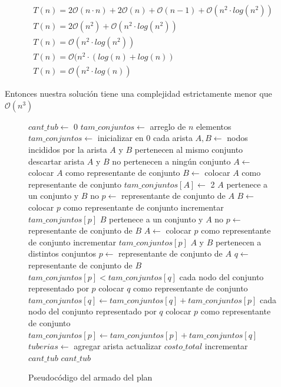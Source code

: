 \begin{equation*}
\begin{array}{l}
T(n) = 2\mathcal{O}(n \cdot n) + 2\mathcal{O}(n) + \mathcal{O}(n-1) + \mathcal{O}(n^2 \cdot log(n^2))\\
T(n) = 2\mathcal{O}(n^2) + \mathcal{O}(n^2 \cdot log(n^2))\\
T(n) = \mathcal{O}(n^2 \cdot log(n^2))\\
T(n) = \mathcal{O}(n^2 \cdot (log(n) + log(n))\\
T(n) = \mathcal{O}(n^2 \cdot log(n))
\end{array}
\end{equation*}

Entonces nuestra solución tiene una complejidad estrictamente menor que $\mathcal{O}(n^3)$

\begin{figure}[!ht]
\begin{codebox}
\li $cant\_tub \leftarrow$ 0
\li $tam\_conjuntos \leftarrow$ arreglo de $n$ elementos
\li $tam\_conjuntos \leftarrow$ inicializar en 0
\li \For cada arista
\li 	\Do 
		$A,B \leftarrow$ nodos incididos por la arista
\li 		\If $A$ y $B$ pertenecen al mismo conjunto
\li 		\Then descartar arista
\li 		\Else
\li			\If $A$ y $B$ no pertenecen a ningún conjunto
\li 			\Then 
				$A \leftarrow$ colocar $A$ como representante de conjunto
\li 				$B \leftarrow$ colocar $A$ como representante de conjunto
\li 				$tam\_conjuntos[A] \leftarrow$ 2
\li			\Else \If $A$ pertenece a un conjunto y $B$ no
\li 				\Then 
					$p \leftarrow$ representante de conjunto de $A$
\li 					$B \leftarrow$ colocar $p$ como representante de conjunto
\li	 				incrementar $tam\_conjuntos[p]$
				\End
\li 			\Else \If $B$ pertenece a un conjunto y $A$ no
\li 				\Then 
					$p \leftarrow$ representante de conjunto de $B$
\li 					$A \leftarrow$ colocar $p$ como representante de conjunto
\li 					incrementar $tam\_conjuntos[p]$
				\End
\li 			\Else \If $A$ y $B$ pertenecen a distintos conjuntos
\li 				\Then
					$p \leftarrow$ representante de conjunto de $A$
\li 					$q \leftarrow$ representante de conjunto de $B$
\li 					\If $tam\_conjuntos[p] < tam\_conjuntos[q]$
\li 					\Then
						\For cada nodo del conjunto representado por $p$
\li 						\Do colocar $q$ como representante de conjunto
						\End
\li 						$tam\_conjuntos[q] \leftarrow tam\_conjuntos[q] + tam\_conjuntos[p]$
\li					\Else 
\li 						\For cada nodo del conjunto representado por $q$
\li						\Do colocar $p$ como representante de conjunto
						\End
\li 						$tam\_conjuntos[p] \leftarrow tam\_conjuntos[p] + tam\_conjuntos[q]$
					\End
				\End
			\End
\li 			$tuberias \leftarrow$ agregar arista
\li 			actualizar $costo\_total$
\li 			incrementar $cant\_tub$
		\End
	\End
\li \Return $cant\_tub$
\end{codebox} 
\caption{Pseudocódigo del armado del plan}\label{code:petroleo.plan}
\end{figure}

